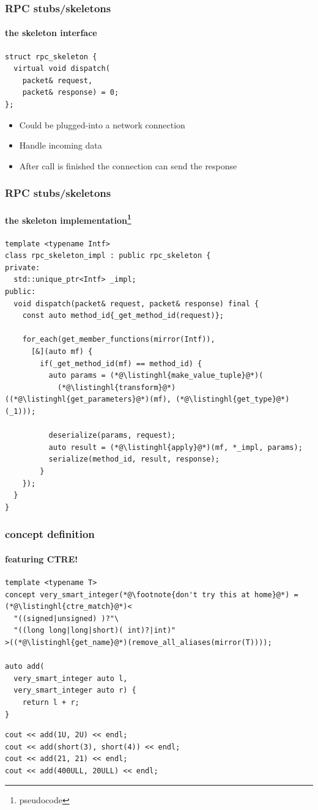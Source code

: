 \documentclass[compress,table,xcolor=table]{beamer}
\begin{document}
\begin{frame}[fragile]
  \frametitle{RPC stubs/skeletons}
  \framesubtitle{the skeleton interface}
  \begin{lstlisting}[language=c++2x]
struct rpc_skeleton {
  virtual void dispatch(
    packet& request,
    packet& response) = 0;
};
  \end{lstlisting}
  \begin{itemize}
    \item Could be plugged-into a network connection
    \item Handle incoming data
    \item After call is finished the connection can send the response
  \end{itemize}
\end{frame}
\begin{frame}[fragile]
  \frametitle{RPC stubs/skeletons}
  \framesubtitle{the skeleton implementation\footnote{pseudocode}}
  \begin{lstlisting}[language=c++2x,basicstyle=\scriptsize\ttfamily]
template <typename Intf>
class rpc_skeleton_impl : public rpc_skeleton {
private:
  std::unique_ptr<Intf> _impl;
public:
  void dispatch(packet& request, packet& response) final {
    const auto method_id{_get_method_id(request)};

    for_each(get_member_functions(mirror(Intf)),
      [&](auto mf) {
        if(_get_method_id(mf) == method_id) {
          auto params = (*@\listinghl{make_value_tuple}@*)(
            (*@\listinghl{transform}@*)((*@\listinghl{get_parameters}@*)(mf), (*@\listinghl{get_type}@*)(_1)));

          deserialize(params, request);
          auto result = (*@\listinghl{apply}@*)(mf, *_impl, params);
          serialize(method_id, result, response);
        }
    });
  }
}
  \end{lstlisting}
\end{frame}
\begin{frame}[fragile]
  \frametitle{ concept definition}
  \framesubtitle{featuring CTRE!}
  \begin{lstlisting}[language=c++2x,basicstyle=\footnotesize\ttfamily]
template <typename T>
concept very_smart_integer(*@\footnote{don't try this at home}@*) = (*@\listinghl{ctre_match}@*)<
  "((signed|unsigned) )?"\
  "((long long|long|short)( int)?|int)"
>((*@\listinghl{get_name}@*)(remove_all_aliases(mirror(T))));

auto add(
  very_smart_integer auto l,
  very_smart_integer auto r) {
    return l + r;
}
  \end{lstlisting}
  \begin{lstlisting}[language=c++2x,basicstyle=\small\ttfamily]
cout << add(1U, 2U) << endl;
cout << add(short(3), short(4)) << endl;
cout << add(21, 21) << endl;
cout << add(400ULL, 20ULL) << endl;
  \end{lstlisting}
\end{frame}
\end{document}
